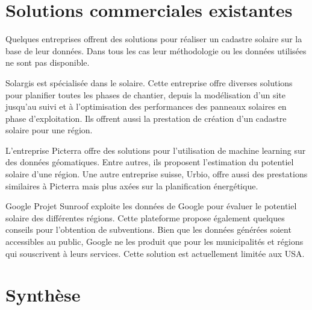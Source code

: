 \section{Solutions commerciales existantes}

\par{Quelques entreprises offrent des solutions pour réaliser un cadastre solaire sur la base de leur données. Dans tous les cas leur méthodologie ou les données utilisées ne sont pas disponible.}

\par{Solargis \cite{solargis_regional_nodate} est spécialisée dans le solaire. Cette entreprise offre diverses solutions pour planifier toutes les phases de chantier, depuis la modélisation d'un site jusqu'au suivi et à l'optimisation des performances des panneaux solaires en phase d'exploitation. Ils offrent aussi la prestation de création d'un cadastre solaire pour une région.}

\par{L'entreprise Picterra \cite{picterra_infrastructure_nodate} offre des solutions pour l'utilisation de machine learning sur des données géomatiques. Entre autres, ils proposent l'estimation du potentiel solaire d'une région. Une autre entreprise suisse, Urbio, \cite{urbio_urbio_nodate} offre aussi des prestations similaires à Picterra mais plus axées sur la planification énergétique.}

\par{Google Projet Sunroof \cite{google_project_nodate} exploite les données de Google pour évaluer le potentiel solaire des différentes régions. Cette plateforme propose également quelques conseils pour l'obtention de subventions. Bien que les données générées soient accessibles au public, Google ne les produit que pour les municipalités et régions qui souscrivent à leurs services. Cette solution est actuellement limitée aux USA.}

\section{Synthèse}































